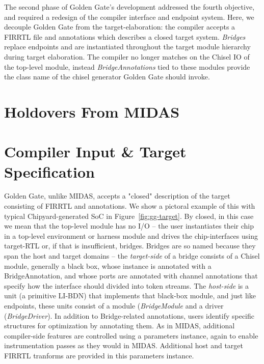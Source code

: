 The second phase of Golden Gate's development addressed the fourth objective,
and required a redesign of the compiler interface and endpoint system. Here, we
decouple Golden Gate from the target-elaboration: the compiler accepts a FIRRTL
file and annotations which describes a closed target system. \emph{Bridges}
replace endpoints and are instantiated throughout the target module hierarchy
during target elaboration. The compiler no longer matches on the Chisel IO of
the top-level module, instead \emph{BridgeAnnotations} tied to these modules
provide the class name of the chisel generator Golden Gate should invoke.

\section{Holdovers From MIDAS}
%

\section{Compiler Input \& Target Specification}

Golden Gate, unlike MIDAS, accepts a "closed" description of the target
consisting of FIRRTL and annotations. We show a pictoral example of this with
typical Chipyard-generated SoC in Figure~\ref{fig:gg-target}. By closed, in
this case we mean that the
top-level module has no I/O -- the user instantiates their chip in a top-level
environment or harness module and drives the chip-interfaces using target-RTL
or, if that is insufficient, bridges. Bridges are so named because they span
the host and target domains -- the \emph{target-side} of a bridge consists of a
Chisel module, generally a black box, whose instance is annotated with a BridgeAnnotation,
and whose ports are annotated with channel annotations that specify how the
interface should divided into token streams. The \emph{host-side} is a unit (a
primitive LI-BDN) that implements that black-box module, and just like
endpoints, these units consist of a module (\emph{BridgeModule} and a driver
(\emph{BridgeDriver}). In addition to Bridge-related annotations, users
identify specific structures for optimization by annotating them. As in MIDAS, additional compiler-side features are controlled using a
parameters instance, again to enable instrumentation passes as they would in
MIDAS. Additional host and target FIRRTL tranforms are provided in this
parameters instance.

